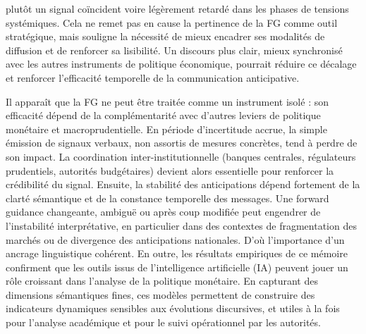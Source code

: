 plutôt un signal coïncident voire légèrement retardé dans les phases de tensions systémiques. Cela ne remet pas en cause la pertinence de la FG comme outil stratégique, mais souligne la nécessité de mieux encadrer ses modalités de diffusion et de renforcer sa lisibilité. Un discours plus clair, mieux synchronisé avec les autres instruments de politique économique, pourrait réduire ce décalage et renforcer l’efficacité temporelle de la communication anticipative.

\newpage

Il apparaît que la FG ne peut être traitée comme un instrument isolé : son efficacité dépend de la complémentarité avec d’autres leviers de politique monétaire et macroprudentielle. En période d’incertitude accrue, la simple émission de signaux verbaux, non assortis de mesures concrètes, tend à perdre de son impact. La coordination inter-institutionnelle (banques centrales, régulateurs prudentiels, autorités budgétaires) devient alors essentielle pour renforcer la crédibilité du signal. Ensuite, la stabilité des anticipations dépend fortement de la clarté sémantique et de la constance temporelle des messages. Une forward guidance changeante, ambiguë ou après coup modifiée peut engendrer de l’instabilité interprétative, en particulier dans des contextes de fragmentation des marchés ou de divergence des anticipations nationales. D’où l’importance d’un ancrage linguistique cohérent. En outre, les résultats empiriques de ce mémoire confirment que les outils issus de l’intelligence artificielle (IA) peuvent jouer un rôle croissant dans l’analyse de la politique monétaire. En capturant des dimensions sémantiques fines, ces modèles permettent de construire des indicateurs dynamiques sensibles aux évolutions discursives, et utiles à la fois pour l’analyse académique et pour le suivi opérationnel par les autorités.\\

